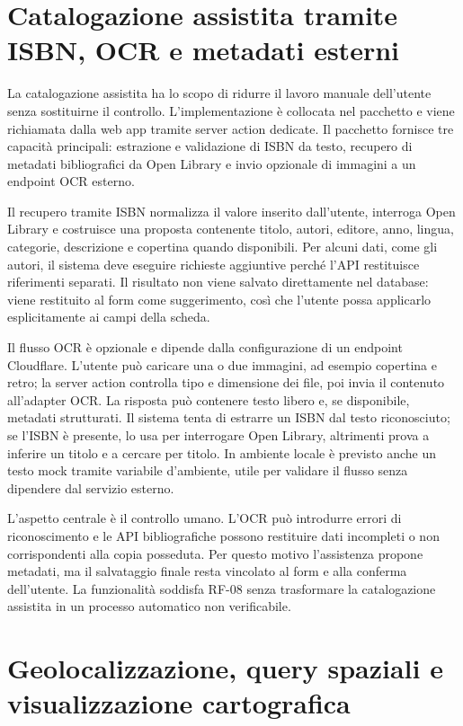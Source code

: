 \section{Catalogazione assistita tramite ISBN, OCR e metadati esterni}
\label{sec:implementazione-catalogazione-assistita}

La catalogazione assistita ha lo scopo di ridurre il lavoro manuale dell'utente senza sostituirne il controllo. L'implementazione è collocata nel pacchetto  e viene richiamata dalla web app tramite server action dedicate. Il pacchetto fornisce tre capacità principali: estrazione e validazione di ISBN da testo, recupero di metadati bibliografici da Open Library e invio opzionale di immagini a un endpoint OCR esterno.

Il recupero tramite ISBN normalizza il valore inserito dall'utente, interroga Open Library e costruisce una proposta contenente titolo, autori, editore, anno, lingua, categorie, descrizione e copertina quando disponibili. Per alcuni dati, come gli autori, il sistema deve eseguire richieste aggiuntive perché l'API restituisce riferimenti separati. Il risultato non viene salvato direttamente nel database: viene restituito al form come suggerimento, così che l'utente possa applicarlo esplicitamente ai campi della scheda.

Il flusso OCR è opzionale e dipende dalla configurazione di un endpoint Cloudflare. L'utente può caricare una o due immagini, ad esempio copertina e retro; la server action controlla tipo e dimensione dei file, poi invia il contenuto all'adapter OCR. La risposta può contenere testo libero e, se disponibile, metadati strutturati. Il sistema tenta di estrarre un ISBN dal testo riconosciuto; se l'ISBN è presente, lo usa per interrogare Open Library, altrimenti prova a inferire un titolo e a cercare per titolo. In ambiente locale è previsto anche un testo mock tramite variabile d'ambiente, utile per validare il flusso senza dipendere dal servizio esterno.

L'aspetto centrale è il controllo umano. L'OCR può introdurre errori di riconoscimento e le API bibliografiche possono restituire dati incompleti o non corrispondenti alla copia posseduta. Per questo motivo l'assistenza propone metadati, ma il salvataggio finale resta vincolato al form e alla conferma dell'utente. La funzionalità soddisfa RF-08 senza trasformare la catalogazione assistita in un processo automatico non verificabile.

\section{Geolocalizzazione, query spaziali e visualizzazione cartografica}
\label{sec:implementazione-geolocalizzazione}

